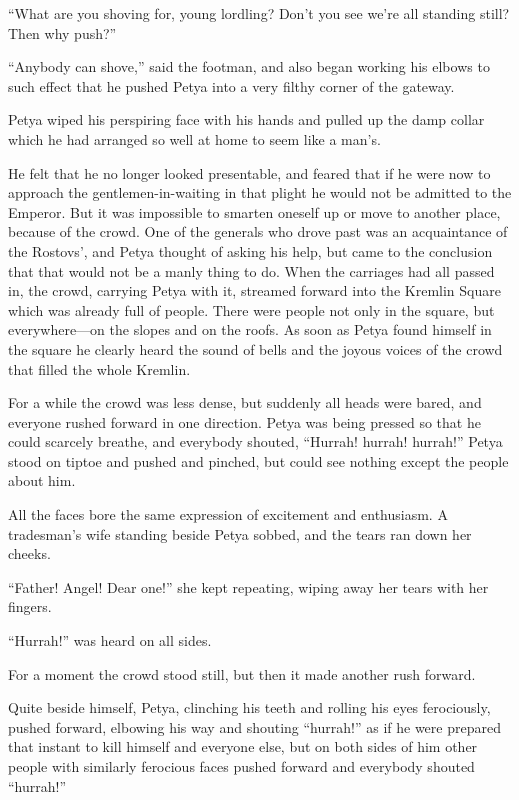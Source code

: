 ``What are you shoving for, young lordling? Don't you see we're
all standing still? Then why push?''

``Anybody can shove,'' said the footman, and also began working
his elbows to such effect that he pushed Petya into a very filthy
corner of the gateway.

Petya wiped his perspiring face with his hands and pulled up the
damp collar which he had arranged so well at home to seem like a
man's.

He felt that he no longer looked presentable, and feared that if
he were now to approach the gentlemen-in-waiting in that plight
he would not be admitted to the Emperor. But it was impossible to
smarten oneself up or move to another place, because of the
crowd. One of the generals who drove past was an acquaintance of
the Rostovs', and Petya thought of asking his help, but came to
the conclusion that that would not be a manly thing to do. When
the carriages had all passed in, the crowd, carrying Petya with
it, streamed forward into the Kremlin Square which was already
full of people. There were people not only in the square, but
everywhere---on the slopes and on the roofs. As soon as Petya
found himself in the square he clearly heard the sound of bells
and the joyous voices of the crowd that filled the whole Kremlin.

For a while the crowd was less dense, but suddenly all heads were
bared, and everyone rushed forward in one direction. Petya was
being pressed so that he could scarcely breathe, and everybody
shouted, ``Hurrah! hurrah!  hurrah!'' Petya stood on tiptoe and
pushed and pinched, but could see nothing except the people about
him.

All the faces bore the same expression of excitement and
enthusiasm. A tradesman's wife standing beside Petya sobbed, and
the tears ran down her cheeks.

``Father! Angel! Dear one!'' she kept repeating, wiping away her
tears with her fingers.

``Hurrah!'' was heard on all sides.

For a moment the crowd stood still, but then it made another rush
forward.

Quite beside himself, Petya, clinching his teeth and rolling his
eyes ferociously, pushed forward, elbowing his way and shouting
``hurrah!'' as if he were prepared that instant to kill himself
and everyone else, but on both sides of him other people with
similarly ferocious faces pushed forward and everybody shouted
``hurrah!''

